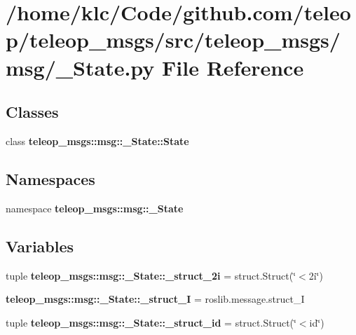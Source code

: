 \section{/home/klc/Code/github.com/teleop/teleop\_\-msgs/src/teleop\_\-msgs/msg/\_\-State.py File Reference}
\label{__State_8py}
\subsection*{Classes}
\begin{DoxyCompactItemize}
\item 
class {\bf teleop\_\-msgs::msg::\_\-State::State}
\end{DoxyCompactItemize}
\subsection*{Namespaces}
\begin{DoxyCompactItemize}
\item 
namespace {\bf teleop\_\-msgs::msg::\_\-State}
\end{DoxyCompactItemize}
\subsection*{Variables}
\begin{DoxyCompactItemize}
\item 
tuple {\bf teleop\_\-msgs::msg::\_\-State::\_\-struct\_\-2i} = struct.Struct(\char`\"{}$<$2i\char`\"{})
\item 
{\bf teleop\_\-msgs::msg::\_\-State::\_\-struct\_\-I} = roslib.message.struct\_\-I
\item 
tuple {\bf teleop\_\-msgs::msg::\_\-State::\_\-struct\_\-id} = struct.Struct(\char`\"{}$<$id\char`\"{})
\end{DoxyCompactItemize}
